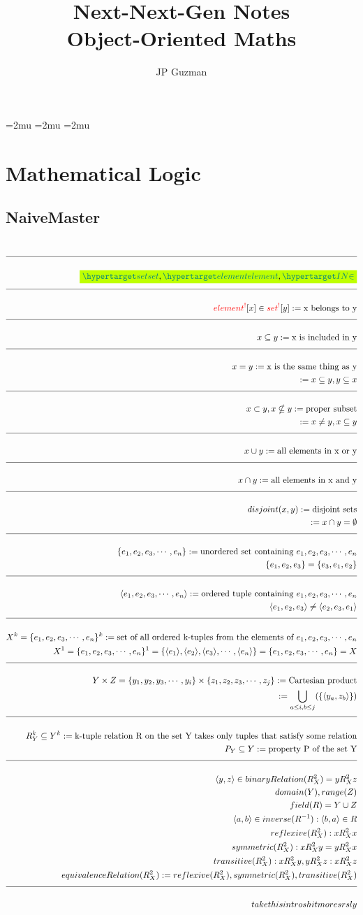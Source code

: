 \documentclass[a4paper]{article}
\title{Next-Next-Gen Notes \\
\large Object-Oriented Maths}
\author{JP Guzman}
\newcommand{\tdb}[1]{\colorbox{lime}{$\displaystyle #1$}}
\newcommand{\uset}[1]{\{#1\}}
\newcommand{\otup}[1]{\langle#1\rangle}
\newcommand{\enlist}[2]{{#1}_{1}, {#1}_{2}, {#1}_{3}, \cdots, {#1}_{#2}}
\newcommand{\n}{\\[1.5ex] \hline \nonumber \\[0ex]}
\newcommand{\m}{\nonumber \\}
\newcommand{\rfrNEW}[1]{%
  \hyperlink{#1}{\csname #1\endcsname}%
  }
\newcommand{\rfr}[1]{%
  \ifcsname#1\endcsname%
    \rfrNEW{#1}%
  \else%
    \textcolor{red}{#1^!}%
  \fi%
}
\begin{document}
\maketitle
\allowdisplaybreaks


\thinmuskip=2mu %
\medmuskip=2mu %
\thickmuskip=2mu %
\setlength{\belowdisplayskip}{0pt} \setlength{\belowdisplayshortskip}{0pt}
\setlength{\abovedisplayskip}{0pt} \setlength{\abovedisplayshortskip}{0pt}


\section{Mathematical Logic}
\subsection{NaiveMaster}
\begin{tcolorbox}
\begin{align}
\n \tdb{\dfn{set}, \dfn{element}, \dfn{IN}[\in]}
\n \rfr{element} [x] \in \rfr{set} [y] := \text{x belongs to y}
\n x \subseteq y := \text{x is included in y}
\n x = y := \text{x is the same thing as y}
\m := x \subseteq y, y \subseteq x
\n x \subset y, x \nsubseteq y := \text{proper subset}
\m := x \neq y, x \subseteq y
\n x \cup y := \text{all elements in x or y}
\n x \cap y := \text{all elements in x and y}
\n disjoint(x, y) := \text{disjoint sets}
\m := x \cap y = \emptyset
\n \uset{\enlist{e}{n}} := \text{unordered set containing $\enlist{e}{n}$}
\m \uset{e_1, e_2, e_3} = \uset{e_3, e_1, e_2}
\n \otup{\enlist{e}{n}} := \text{ordered tuple containing $\enlist{e}{n}$}
\m \otup{e_1, e_2, e_3} \neq \otup{e_2, e_3, e_1}
\n X^k = \uset{\enlist{e}{n}}^k := \text{set of all ordered k-tuples from the elements of $\enlist{e}{n}$}
\m X^1 = \uset{\enlist{e}{n}}^1 = \uset{\otup{e_1}, \otup{e_2}, \otup{e_3}, \cdots, \otup{e_n}} = \uset{\enlist{e}{n}} = X
\n Y \times Z = \uset{\enlist{y}{i}} \times \uset{\enlist{z}{j}} := \text{Cartesian product}
\m := \bigcup_{a \leq i, b \leq j} (\uset{\otup{y_a, z_b}})
\n R^k_Y \subseteq Y^k := \text{k-tuple relation R on the set Y takes only tuples that satisfy some relation}
\m P_Y \subseteq Y := \text{property P of the set Y}
\n \otup{y, z} \in binaryRelation(R^2_X) = y R^2_X z
\m domain(Y), range(Z)
\m field(R) = Y \cup Z
\m \otup{a, b} \in inverse(R^{-1}) : \otup{b, a} \in R 
\m reflexive(R^2_X) : x R^2_X x
\m symmetric(R^2_X) : x R^2_X y = y R^2_X x
\m transitive(R^2_X) : x R^2_X y, y R^2_X z : x R^2_X z
\m equivalenceRelation(R^2_X) := reflexive(R^2_X), symmetric(R^2_X), transitive(R^2_X)
\n take this intro shit more srsly 
\end{align}
\end{tcolorbox}
\end{document}
